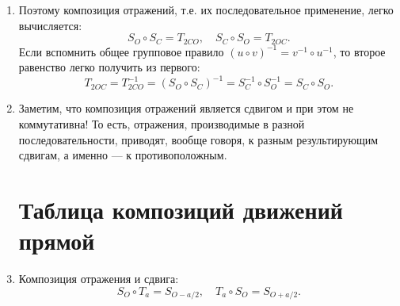 \begin{enumerate}
\item Поэтому композиция отражений, т.е. их последовательное применение, легко вычисляется:
\begin{equation}\label{SOSC}
S_O\circ S_C=T_{2CO},\quad S_C\circ S_O=T_{2OC}.
\end{equation}
Если вспомнить общее групповое правило $(u\circ v)^{-1} = v^{-1}\circ u^{-1}$, то второе равенство легко получить из первого:
$$
T_{2OC} = T_{2CO}^{-1} = (S_O\circ S_C)^{-1} = S_C^{-1}\circ S_O^{-1}=S_C\circ S_O.
$$
\item Заметим, что композиция отражений является сдвигом и при этом не коммутативна! То есть, отражения, производимые в разной последовательности, приводят, вообще говоря, к разным результирующим сдвигам, а именно --- к противоположным.



\section{Таблица композиций движений прямой}




\item Композиция отражения и сдвига:
\begin{equation}\label{SOTa}
S_O\circ T_a = S_{O-a/2},\quad T_a\circ S_O = S_{O+a/2}.
\end{equation}


\end{enumerate}
